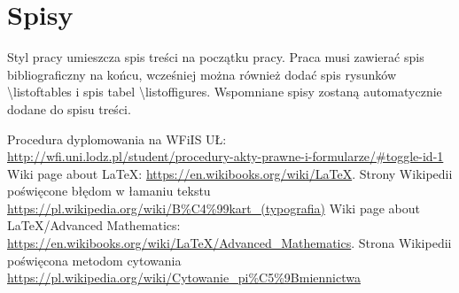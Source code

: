 \documentclass{wfiisul}
\begin{document}
\section{Spisy}
Styl pracy umieszcza spis treści na początku pracy. Praca musi zawierać spis bibliograficzny na końcu, wcześniej można również dodać spis rysunków  {\textbackslash}listoftables i spis tabel {\textbackslash}listoffigures. Wspomniane spisy zostaną automatycznie dodane do spisu treści.

\listoftables
\listoffigures

 Procedura dyplomowania na WFiIS UŁ:
\url{http://wfi.uni.lodz.pl/student/procedury-akty-prawne-i-formularze/#toggle-id-1}
 Wiki page about LaTeX: \url{https://en.wikibooks.org/wiki/LaTeX}.
 Strony Wikipedii poświęcone błędom w łamaniu tekstu\\
\url{https://pl.wikipedia.org/wiki/B%C4%99kart_(typografia)}
 Wiki page about LaTeX/Advanced Mathematics: \url{https://en.wikibooks.org/wiki/LaTeX/Advanced_Mathematics}.
 Strona Wikipedii poświęcona metodom cytowania \\
\url{https://pl.wikipedia.org/wiki/Cytowanie_pi%C5%9Bmiennictwa}
\end{document}
